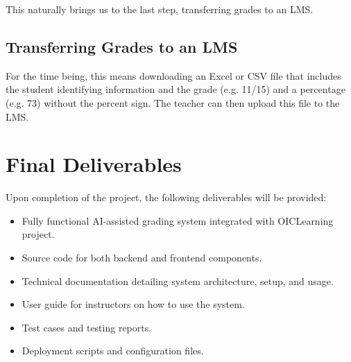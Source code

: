 \documentclass[ms,twoside,print]{nuthesis}
\begin{document}
This naturally brings us to the last step, transferring grades to an LMS.

\subsection{Transferring Grades to an LMS}

For the time being, this means downloading an Excel or CSV file that includes the student identifying information and the grade (e.g. 11/15) and a percentage (e.g. 73) without the percent sign. The teacher can then upload this file to the LMS.

\section{Final Deliverables}

Upon completion of the project, the following deliverables will be provided:

\begin{itemize}
    \item Fully functional AI-assisted grading system integrated with OICLearning project.
    \item Source code for both backend and frontend components.
    \item Technical documentation detailing system architecture, setup, and usage.
    \item User guide for instructors on how to use the system.
    \item Test cases and testing reports.
    \item Deployment scripts and configuration files.
\end{itemize}










\end{document}
